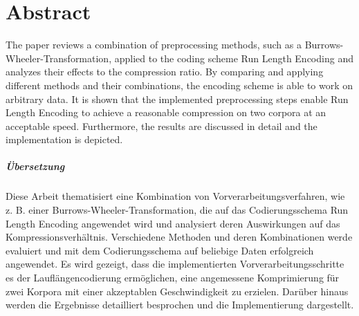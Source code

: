 \chapter*{Abstract}
The paper reviews a combination of preprocessing methods, such as a Burrows-Wheeler-Transformation, applied to the coding scheme Run Length Encoding and analyzes their effects to the compression ratio. By comparing and applying different methods and their combinations, the encoding scheme is able to work on arbitrary data. It is shown that the implemented preprocessing steps enable Run Length Encoding to achieve a reasonable compression on two corpora at an acceptable speed. Furthermore, the results are discussed in detail and the implementation is depicted.

\paragraph{Übersetzung}
Diese Arbeit thematisiert eine Kombination von Vorverarbeitungsverfahren, wie z. B. einer Burrows-Wheeler-Transformation, die auf das Codierungsschema Run Length Encoding angewendet wird und analysiert deren Auswirkungen auf das Kompressionsverhältnis. Verschiedene Methoden und deren Kombinationen werde evaluiert und mit dem Codierungsschema auf beliebige Daten erfolgreich angewendet. Es wird gezeigt, dass die implementierten Vorverarbeitungsschritte es der Lauflängencodierung ermöglichen, eine angemessene Komprimierung für zwei Korpora mit einer akzeptablen Geschwindigkeit zu erzielen. Darüber hinaus werden die Ergebnisse detailliert besprochen und die Implementierung dargestellt.